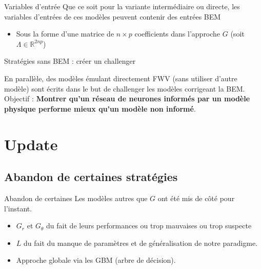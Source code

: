 \documentclass[
11pt,notheorems,hyperref={pdfauthor=whatever}
]{beamer}
\begin{document}
\begin{frame}{Variables d'entrée}
    Que ce soit pour la variante intermédiaire ou directe, les variables d'entrées de ces modèles peuvent contenir des entrées BEM 
    \begin{itemize}
        \item Sous la forme d'une matrice de $n \times p$ coefficients dans l'approche $G$ (soit $ \Lambda \in \mathbb{R}^{2np}$)
    \end{itemize}
\end{frame}

\begin{frame}{Stratégies sans BEM : créer un challenger}
    \begin{center}
    En parallèle, des modèles émulant directement FWV (sans utiliser d'autre modèle) sont écrits dans le but de challenger les modèles corrigeant la BEM.\\ 
    Objectif : \textbf{Montrer qu'un réseau de neurones informés par un modèle physique performe mieux qu'un modèle non informé}.
    \end{center}
\end{frame}


\section{Update}

\subsection{Abandon de certaines stratégies}
\begin{frame}{Abandon de certaines}
    Les modèles autres que $G$ ont été mis de côté pour l'instant. 
    \begin{itemize}
    \item $G_r$ et $G_{\theta}$ du fait de leurs performances ou trop mauvaises ou trop suspecte
    \item $L$ du fait du manque de paramètres et de généralisation de notre paradigme. 
    \item Approche globale via les GBM (arbre de décision).
    \end{itemize} 
\end{frame}
\end{document}
